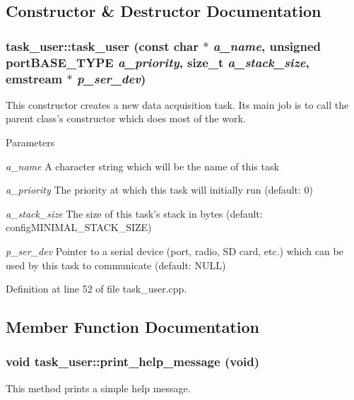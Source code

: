 \subsection{Constructor \& Destructor Documentation}
\hypertarget{classtask__user_a3aba77563b375bb14838800608da48bc}{
\subsubsection[{task\_\-user}]{\setlength{\rightskip}{0pt plus 5cm}task\_\-user::task\_\-user (const char $\ast$ {\em a\_\-name}, \/  unsigned portBASE\_\-TYPE {\em a\_\-priority}, \/  size\_\-t {\em a\_\-stack\_\-size}, \/  emstream $\ast$ {\em p\_\-ser\_\-dev})}}
\label{classtask__user_a3aba77563b375bb14838800608da48bc}
This constructor creates a new data acquisition task. Its main job is to call the parent class's constructor which does most of the work. 
\begin{DoxyParams}{Parameters}
\item[{\em a\_\-name}]A character string which will be the name of this task \item[{\em a\_\-priority}]The priority at which this task will initially run (default: 0) \item[{\em a\_\-stack\_\-size}]The size of this task's stack in bytes (default: configMINIMAL\_\-STACK\_\-SIZE) \item[{\em p\_\-ser\_\-dev}]Pointer to a serial device (port, radio, SD card, etc.) which can be used by this task to communicate (default: NULL) \end{DoxyParams}


Definition at line 52 of file task\_\-user.cpp.

\subsection{Member Function Documentation}
\hypertarget{classtask__user_a75475060f83bae1e44bcc8a5c34015c7}{
\subsubsection[{print\_\-help\_\-message}]{\setlength{\rightskip}{0pt plus 5cm}void task\_\-user::print\_\-help\_\-message (void)}}
\label{classtask__user_a75475060f83bae1e44bcc8a5c34015c7}
This method prints a simple help message. 

